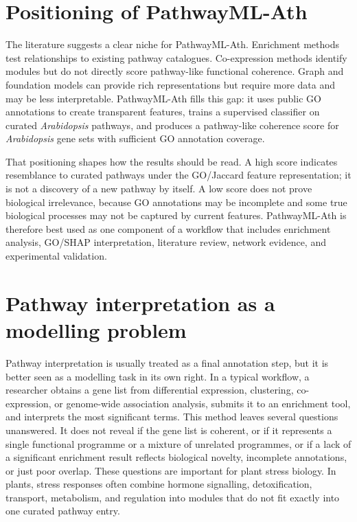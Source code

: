 \documentclass[12pt,letterpaper,oneside,openany]{book}
\begin{document}
\section{Positioning of PathwayML-Ath}
\label{sec:lit_positioning}

The literature suggests a clear niche for PathwayML-Ath. Enrichment methods test relationships to existing pathway catalogues. Co-expression methods identify modules but do not directly score pathway-like functional coherence. Graph and foundation models can provide rich representations but require more data and may be less interpretable. PathwayML-Ath fills this gap: it uses public GO annotations to create transparent features, trains a supervised classifier on curated \textit{Arabidopsis} pathways, and produces a pathway-like coherence score for \textit{Arabidopsis} gene sets with sufficient GO annotation coverage.

That positioning shapes how the results should be read. A high score indicates resemblance to curated pathways under the GO/Jaccard feature representation; it is not a discovery of a new pathway by itself. A low score does not prove biological irrelevance, because GO annotations may be incomplete and some true biological processes may not be captured by current features. PathwayML-Ath is therefore best used as one component of a workflow that includes enrichment analysis, GO/SHAP interpretation, literature review, network evidence, and experimental validation.




\section{Pathway interpretation as a modelling problem}
\label{sec:bg_why_thesis}

Pathway interpretation is usually treated as a final annotation step, but it is better seen as a modelling task in its own right. In a typical workflow, a researcher obtains a gene list from differential expression, clustering, co-expression, or genome-wide association analysis, submits it to an enrichment tool, and interprets the most significant terms. This method leaves several questions unanswered. It does not reveal if the gene list is coherent, or if it represents a single functional programme or a mixture of unrelated programmes, or if a lack of a significant enrichment result reflects biological novelty, incomplete annotations, or just poor overlap. These questions are important for plant stress biology. In plants, stress responses often combine hormone signalling, detoxification, transport, metabolism, and regulation into modules that do not fit exactly into one curated pathway entry.
\end{document}
